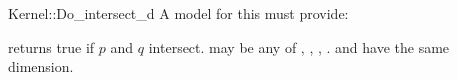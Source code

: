 \begin{ccRefFunctionObjectConcept}{Kernel::Do_intersect_d}
A model for this must provide:


{returns true if $p$ and $q$ intersect.  may be any of
  , , ,
  .  \ccPrecond {} and  have the
  same dimension.}

\end{ccRefFunctionObjectConcept}
